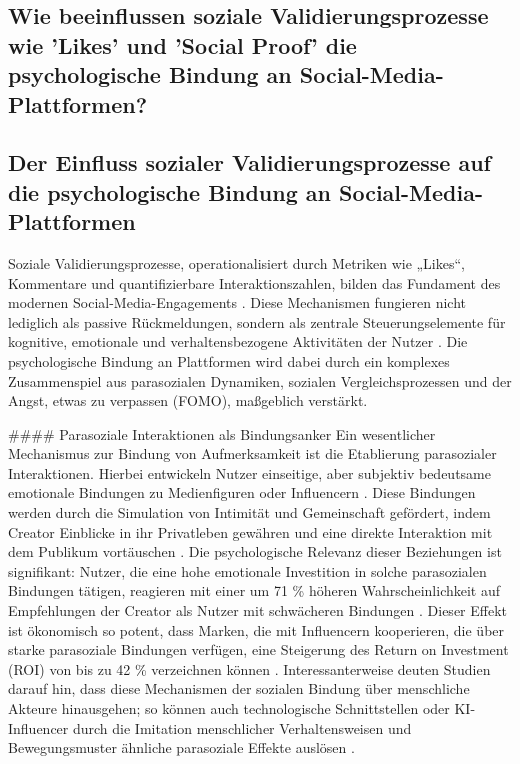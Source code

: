 \documentclass[11pt,a4paper]{article}
\begin{document}
\subsection{Wie beeinflussen soziale Validierungsprozesse wie 'Likes' und 'Social Proof' die psychologische Bindung an Social-Media-Plattformen?}

\subsection{Der Einfluss sozialer Validierungsprozesse auf die psychologische Bindung an Social-Media-Plattformen}

Soziale Validierungsprozesse, operationalisiert durch Metriken wie „Likes“, Kommentare und quantifizierbare Interaktionszahlen, bilden das Fundament des modernen Social-Media-Engagements \autocite{openalex_W2946816985}. Diese Mechanismen fungieren nicht lediglich als passive Rückmeldungen, sondern als zentrale Steuerungselemente für kognitive, emotionale und verhaltensbezogene Aktivitäten der Nutzer \autocite{openalex_W2946816985}. Die psychologische Bindung an Plattformen wird dabei durch ein komplexes Zusammenspiel aus parasozialen Dynamiken, sozialen Vergleichsprozessen und der Angst, etwas zu verpassen (FOMO), maßgeblich verstärkt.

\#\#\#\# Parasoziale Interaktionen als Bindungsanker Ein wesentlicher Mechanismus zur Bindung von Aufmerksamkeit ist die Etablierung parasozialer Interaktionen. Hierbei entwickeln Nutzer einseitige, aber subjektiv bedeutsame emotionale Bindungen zu Medienfiguren oder Influencern \autocite{europepmc_42073973}. Diese Bindungen werden durch die Simulation von Intimität und Gemeinschaft gefördert, indem Creator Einblicke in ihr Privatleben gewähren und eine direkte Interaktion mit dem Publikum vortäuschen \autocite{grey_grey_5d5c282590c448fc8776b04f78a08de5}. Die psychologische Relevanz dieser Beziehungen ist signifikant: Nutzer, die eine hohe emotionale Investition in solche parasozialen Bindungen tätigen, reagieren mit einer um 71 \% höheren Wahrscheinlichkeit auf Empfehlungen der Creator als Nutzer mit schwächeren Bindungen \autocite{grey_grey_5d5c282590c448fc8776b04f78a08de5}. Dieser Effekt ist ökonomisch so potent, dass Marken, die mit Influencern kooperieren, die über starke parasoziale Bindungen verfügen, eine Steigerung des Return on Investment (ROI) von bis zu 42 \% verzeichnen können \autocite{grey_grey_5d5c282590c448fc8776b04f78a08de5}. Interessanterweise deuten Studien darauf hin, dass diese Mechanismen der sozialen Bindung über menschliche Akteure hinausgehen; so können auch technologische Schnittstellen oder KI-Influencer durch die Imitation menschlicher Verhaltensweisen und Bewegungsmuster ähnliche parasoziale Effekte auslösen \autocite{arxiv_2301_09025}.
\end{document}

